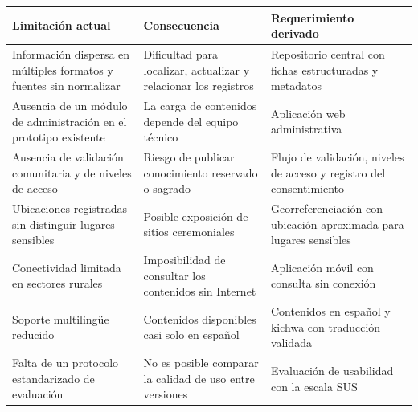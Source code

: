 {\centering\singlespacing
  \label{tab:diagnostico}
  \begin{tabular}{|p{}|p{}|p{}|}
    \hline
    \textbf{Limitación actual} & \textbf{Consecuencia} & \textbf{Requerimiento derivado} \tabularnewline
    \hline
    \raggedright\hspace{0pt}Información dispersa en múltiples formatos y fuentes sin normalizar & \raggedright\hspace{0pt}Dificultad para localizar, actualizar y relacionar los registros & \raggedright\hspace{0pt}Repositorio central con fichas estructuradas y metadatos \tabularnewline
    \hline
    \raggedright\hspace{0pt}Ausencia de un módulo de administración en el prototipo existente & \raggedright\hspace{0pt}La carga de contenidos depende del equipo técnico & \raggedright\hspace{0pt}Aplicación web administrativa \tabularnewline
    \hline
    \raggedright\hspace{0pt}Ausencia de validación comunitaria y de niveles de acceso & \raggedright\hspace{0pt}Riesgo de publicar conocimiento reservado o sagrado & \raggedright\hspace{0pt}Flujo de validación, niveles de acceso y registro del consentimiento \tabularnewline
    \hline
    \raggedright\hspace{0pt}Ubicaciones registradas sin distinguir lugares sensibles & \raggedright\hspace{0pt}Posible exposición de sitios ceremoniales & \raggedright\hspace{0pt}Georreferenciación con ubicación aproximada para lugares sensibles \tabularnewline
    \hline
    \raggedright\hspace{0pt}Conectividad limitada en sectores rurales & \raggedright\hspace{0pt}Imposibilidad de consultar los contenidos sin Internet & \raggedright\hspace{0pt}Aplicación móvil con consulta sin conexión \tabularnewline
    \hline
    \raggedright\hspace{0pt}Soporte multilingüe reducido & \raggedright\hspace{0pt}Contenidos disponibles casi solo en español & \raggedright\hspace{0pt}Contenidos en español y kichwa con traducción validada \tabularnewline
    \hline
    \raggedright\hspace{0pt}Falta de un protocolo estandarizado de evaluación & \raggedright\hspace{0pt}No es posible comparar la calidad de uso entre versiones & \raggedright\hspace{0pt}Evaluación de usabilidad con la escala SUS \tabularnewline
    \hline
  \end{tabular}\par}


